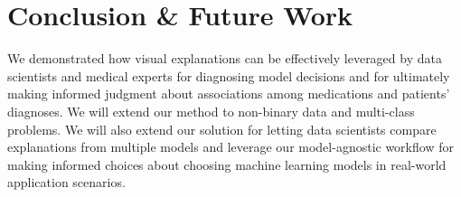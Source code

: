 





\section{Conclusion \& Future Work}
We demonstrated how visual explanations can be effectively leveraged by data scientists and medical experts for diagnosing model decisions and for ultimately making informed judgment about associations among medications and patients' diagnoses. 
We will extend our method to non-binary data and multi-class problems. We will also extend our solution for letting data scientists compare explanations from multiple models and leverage our model-agnostic workflow for making informed choices about choosing machine learning models in real-world application scenarios.




